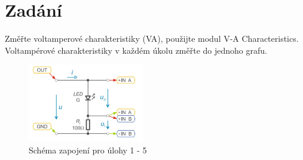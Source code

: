 \documentclass[a4paper]{article}
\begin{document}



\section*{Zadání}
Změřte voltamperové charakteristiky (VA), použijte modul V-A Characteristics. Voltampérové
charakteristiky v každém úkolu změřte do jednoho grafu.
\begin{figure}[h]
	\centering
	\includegraphics[width=0.45\textwidth]{zapojeni1.png}
	\caption{Schéma zapojení pro úlohy 1 - 5}
	\label{fig:mesh1}
\end{figure}
\end{document}
